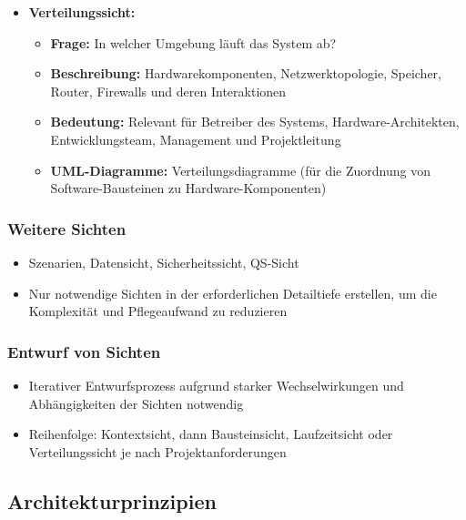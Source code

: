 \documentclass[11pt, a4paper]{article}
\begin{document}
\begin{itemize}
    \newpage

    \item \textbf{Verteilungssicht:}
    \begin{itemize}
        \item \textbf{Frage:} In welcher Umgebung läuft das System ab?
        \item \textbf{Beschreibung:} Hardwarekomponenten, Netzwerktopologie, Speicher, Router, Firewalls und deren Interaktionen
        \item \textbf{Bedeutung:} Relevant für Betreiber des Systems, Hardware-Architekten, Entwicklungsteam, Management und Projektleitung
        \item \textbf{UML-Diagramme:} Verteilungsdiagramme (für die Zuordnung von Software-Bausteinen zu Hardware-Komponenten)
    \end{itemize}
\end{itemize}

\raggedright \subsubsection{Weitere Sichten}
\begin{itemize}
    \item Szenarien, Datensicht, Sicherheitssicht, QS-Sicht
    \item Nur notwendige Sichten in der erforderlichen Detailtiefe erstellen, um die Komplexität und Pflegeaufwand zu reduzieren
\end{itemize}

\subsubsection{Entwurf von Sichten}
\begin{itemize}
    \item Iterativer Entwurfsprozess aufgrund starker Wechselwirkungen und Abhängigkeiten der Sichten notwendig
    \item Reihenfolge: Kontextsicht, dann Bausteinsicht, Laufzeitsicht oder Verteilungssicht je nach Projektanforderungen
\end{itemize}

\newpage

\subsection{Architekturprinzipien}
\end{document}
